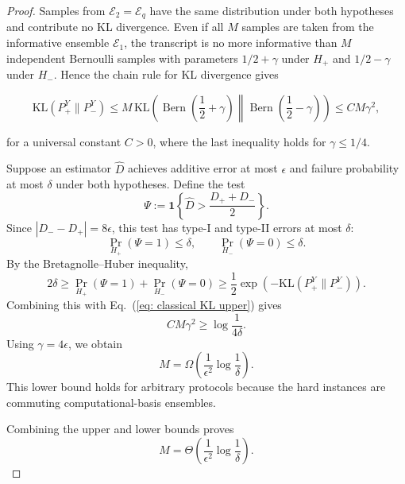 \documentclass[aps,prx,reprint,superscriptaddress,amsmath,amssymb,longbibliography,floatfix]{revtex4-2}
\newcommand{\scE}{\mathcal{E}}
\theoremstyle{plain}
\theoremstyle{definition}
\theoremstyle{remark}
\begin{document}
\begin{proof}
Samples from \(\scE_2=\scE_q\) have the same distribution under both hypotheses and contribute no KL divergence. Even if all \(M\) samples are taken from the informative ensemble \(\scE_1\), the transcript is no more informative than \(M\) independent Bernoulli samples with parameters \(1/2+\gamma\) under \(H_+\) and \(1/2-\gamma\) under \(H_-\). Hence the chain rule for KL divergence gives
\begin{widetext}
\begin{equation}
    \mathrm{KL}(P_+^Y\|P_-^Y)
    \le
    M\,
    \mathrm{KL}\!\left(
        \operatorname{Bern}\!\left(\frac12+\gamma\right)
        \middle\|
        \operatorname{Bern}\!\left(\frac12-\gamma\right)
    \right)
    \le
    C M\gamma^2 ,
    \label{eq: classical KL upper}
\end{equation}
\end{widetext}
for a universal constant \(C>0\), where the last inequality holds for \(\gamma\le1/4\).

Suppose an estimator \(\widehat D\) achieves additive error at most \(\epsilon\) and failure probability at most \(\delta\) under both hypotheses. Define the test
\begin{equation}
    \Psi
    :=
    \mathbf 1\!\left\{
        \widehat D>
        \frac{D_++D_-}{2}
    \right\}.
\end{equation}
Since \(|D_- - D_+|=8\epsilon\), this test has type-I and type-II errors at most \(\delta\):
\[
    \Pr_{H_+}(\Psi=1)\le\delta,
    \qquad
    \Pr_{H_-}(\Psi=0)\le\delta .
\]
By the Bretagnolle--Huber inequality,
\begin{equation}
    2\delta
    \ge
    \Pr_{H_+}(\Psi=1)+\Pr_{H_-}(\Psi=0)
    \ge
    \frac12
    \exp\!\left(
        -\mathrm{KL}(P_+^Y\|P_-^Y)
    \right).
\end{equation}
Combining this with Eq.~(\ref{eq: classical KL upper}) gives
\begin{equation}
    C M\gamma^2
    \ge
    \log\frac1{4\delta}.
\end{equation}
Using \(\gamma=4\epsilon\), we obtain
\begin{equation}
    M
    =
    \Omega\!\left(
        \frac{1}{\epsilon^2}\log\frac1\delta
    \right).
\end{equation}
This lower bound holds for arbitrary protocols because the hard instances are commuting computational-basis ensembles.

Combining the upper and lower bounds proves
\begin{equation}
    M
    =
    \Theta\!\left(
        \frac{1}{\epsilon^2}\log\frac1\delta
    \right).
\label{eq:app-classical-matching-complexity}
\end{equation}
\end{proof}
\end{document}
